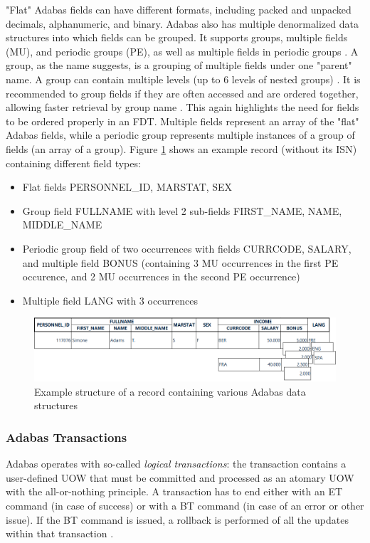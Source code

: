 "Flat" Adabas fields can have different formats, including packed and unpacked decimals, alphanumeric, and binary. Adabas also has multiple denormalized data structures into which fields can be grouped. It supports groups, multiple fields (MU), and periodic groups (PE), as well as multiple fields in periodic groups \cite{aebi1996reengineering}. A group, as the name suggests, is a grouping of multiple fields under one "parent" name. A group can contain multiple levels (up to 6 levels of nested groups) \cite{storr1994effizienter}. It is recommended to group fields if they are often accessed and are ordered together, allowing faster retrieval by group name \cite{adabasconcepts}. This again highlights the need for fields to be ordered properly in an \ac{FDT}. Multiple fields represent an array of the "flat" Adabas fields, while a periodic group represents multiple instances of a group of fields (an array of a group). Figure \ref{fig:fundamentals:datastructure} shows an example record (without its \ac{ISN}) containing different field types:
\begin{itemize}
    \item Flat fields PERSONNEL\_ID, MARSTAT, SEX
    \item Group field FULLNAME with level 2 sub-fields FIRST\_NAME, NAME, MIDDLE\_NAME
    \item Periodic group field of two occurrences with fields CURRCODE, SALARY, and multiple field BONUS (containing 3 MU occurrences in the first PE occurence, and 2 MU occurrences in the second PE occurrence)
    \item Multiple field LANG with 3 occurrences
\end{itemize}

\begin{figure}[htbp]
 \centering
 \includegraphics[width=1\textwidth]{chapters/images/datastructures.png}
 \caption{Example structure of a record containing various Adabas data structures}
 \label{fig:fundamentals:datastructure}
\end{figure}

\subsubsection{Adabas Transactions}
\label{ch02:fundamentals:adabas:forzos:transactions}
Adabas operates with so-called \textit{logical transactions}: the transaction contains a user-defined \ac{UOW} that must be committed and processed as an atomary \ac{UOW} with the all-or-nothing principle. A transaction has to end either with an \ac{ET} command (in case of success) or with a \ac{BT} command (in case of an error or other issue). If the \ac{BT} command is issued, a rollback is performed of all the updates within that transaction \cite{adabasconcepts}.

